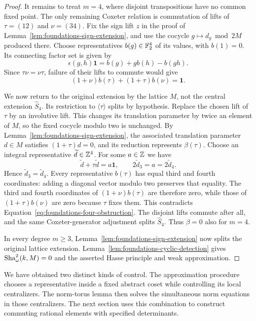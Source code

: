 \begin{proof}
It remains to treat \(m=4\), where disjoint transpositions have
no common fixed point.  The only remaining Coxeter relation is
commutation of lifts of
\(\tau=(12)\) and \(\nu=(34)\).
Fix the sign lift \(z\) in the proof of
Lemma~\ref{lem:foundations-sign-extension}, and use the cocycle
\(g\mapsto d_g\bmod2M\) produced there.  Choose representatives
\(b(g)\in\mathbb F_2^4\) of its values, with \(b(1)=0\).
Its connecting factor set is given by
\[
 \epsilon(g,h)\mathbf1=b(g)+g b(h)-b(gh).
\]
Since \(\tau\nu=\nu\tau\), failure of their lifts to commute would
give
\begin{equation}\label{eq:foundations-four-obstruction}
       (1+\nu)b(\tau)+(1+\tau)b(\nu)=\mathbf1 .
\end{equation}

We now return to the original extension by the lattice \(M\),
not the central extension \(\widehat S_4\).
Its restriction to \(\langle\tau\rangle\) splits by hypothesis.
Replace the chosen lift of \(\tau\) by an involutive lift.
This changes its translation parameter by twice an element of \(M\),
so the fixed cocycle modulo two is unchanged.  By
Lemma~\ref{lem:foundations-sign-extension}, the associated
translation parameter \(d\in M\) satisfies
\((1+\tau)d=0\), and its reduction represents \(\beta(\tau)\).
Choose an integral representative
\(\widetilde d\in\mathbb Z^4\).  For some \(a\in\mathbb Z\) we have
\[
           \widetilde d+\tau\widetilde d=a\mathbf1,
                \qquad 2\widetilde d_3=a=2\widetilde d_4.
\]
Hence \(\widetilde d_3=\widetilde d_4\).
Every representative \(b(\tau)\) has equal third and fourth
coordinates: adding a diagonal vector modulo two preserves that
equality.  The third and fourth coordinates of
\((1+\nu)b(\tau)\) are therefore zero, while those of
\((1+\tau)b(\nu)\) are zero because \(\tau\) fixes them.
This contradicts Equation~\ref{eq:foundations-four-obstruction}.
The disjoint lifts commute after all, and the same Coxeter-generator
adjustment splits \(\widehat S_4\).  Thus \(\beta=0\) also for \(m=4\).

In every degree \(m\geq3\),
Lemma~\ref{lem:foundations-sign-extension} now splits the original
lattice extension.  Lemma~\ref{lem:foundations-cyclic-detection}
gives \(\operatorname{Sha}_\omega^2(k,M)=0\) and the asserted Hasse principle
and weak approximation.
\end{proof}

We have obtained two distinct kinds of control.  The approximation
procedure chooses a representative inside a fixed abstract coset
while controlling its local centralizers.  The norm-torus lemma
then solves the simultaneous norm equations in those centralizers.
The next section uses this combination to construct commuting
rational elements with specified determinants.
